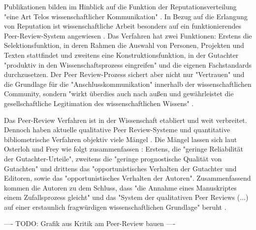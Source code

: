 \begin{enumerate}
\begin{end}
Publikationen bilden im Hinblick auf die Funktion der Reputationsverteilung "eine Art Telos wissenschaftlicher Kommunikation" \cite{hirschauer2004peer}. In Bezug auf die Erlangung von Reputation ist wissenschaftliche Arbeit besonders auf ein funktionierendes Peer-Review-System angewiesen \cite{suchen}. Das Verfahren hat zwei Funktionen: Erstens die Selektionsfunktion, in deren Rahmen die Auswahl von Personen, Projekten und Texten stattfindet und zweitens eine Konstruktionsfunktion, in der Gutachter "produktiv in den Wissenschaftsprozess eingreifen" \cite{Neidhardt_2010} und die eigenen Fachstandards durchzusetzen. Der Peer Review-Prozess sichert aber nicht nur "Vertrauen" und die Grundlage für die "Anschlusskommunikation" innerhalb der wissenschaftlichen Community, sondern "wirkt überdies auch nach außen und gewährleistet die gesellschaftliche Legitimation des wissenschaftlichen Wissens" \cite{pscheida_2010_wikipedia}.

Das Peer-Review Verfahren ist in der Wissenschaft etabliert und weit verbreitet. Dennoch haben aktuelle qualitative Peer Review-Systeme und quantitative bibliometrische Verfahren objektiv viele Mängel\cite{Peters_2014} \cite{Lee_2012} \cite{osterloh2008anreize}  \cite{ware_2008_peer} \cite{Jansen_2007}. Die Mängel lassen sich laut Osterloh und Frey wie folgt zusammenfassen \cite{osterloh2008anreize}: Erstens, die "geringe Reliabilität der Gutachter-Urteile", zweitens die "geringe prognostische Qualität von Gutachten" und drittens das "opportunistisches Verhalten der Gutachter und Editoren, sowie das "opportunistisches Verhalten der Autoren". Zusammenfassend kommen die Autoren zu dem Schluss, dass "die Annahme eines Manuskriptes einem Zufallsprozess gleicht" und das "System der qualitativen Peer Reviews (...) auf einer erstaunlich fragwürdigen wissenschaftlichen Grundlage" beruht \cite{osterloh2008anreize}.

---- TODO: Grafik aus Kritik am Peer-Review bauen \cite{mueller_2009_peerreview} ----


\end{end}
\end{enumerate}
